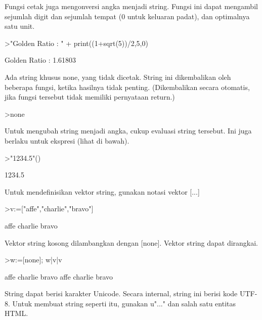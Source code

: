 \documentclass[a4paper,10pt]{article}
\begin{document}
\begin{eulernotebook}
\begin{eulercomment}
\begin{eulercomment}
\begin{eulercomment}
Fungsi cetak juga mengonversi angka menjadi string. Fungsi ini dapat
mengambil sejumlah digit dan sejumlah tempat (0 untuk keluaran padat),
dan optimalnya satu unit.
\end{eulercomment}
\begin{eulerprompt}
>"Golden Ratio : " + print((1+sqrt(5))/2,5,0)
\end{eulerprompt}
\begin{euleroutput}
  Golden Ratio : 1.61803
\end{euleroutput}
\begin{eulercomment}
Ada string khusus none, yang tidak dicetak. String ini dikembalikan
oleh beberapa fungsi, ketika hasilnya tidak penting. (Dikembalikan
secara otomatis, jika fungsi tersebut tidak memiliki pernyataan
return.)
\end{eulercomment}
\begin{eulerprompt}
>none
\end{eulerprompt}
\begin{eulercomment}
Untuk mengubah string menjadi angka, cukup evaluasi string tersebut.
Ini juga berlaku untuk ekspresi (lihat di bawah).
\end{eulercomment}
\begin{eulerprompt}
>"1234.5"()
\end{eulerprompt}
\begin{euleroutput}
  1234.5
\end{euleroutput}
\begin{eulercomment}
Untuk mendefinisikan vektor string, gunakan notasi vektor [...]
\end{eulercomment}
\begin{eulerprompt}
>v:=["affe","charlie","bravo"]
\end{eulerprompt}
\begin{euleroutput}
  affe
  charlie
  bravo
\end{euleroutput}
\begin{eulercomment}
Vektor string kosong dilambangkan dengan [none]. Vektor string dapat
dirangkai.
\end{eulercomment}
\begin{eulerprompt}
>w:=[none]; w|v|v
\end{eulerprompt}
\begin{euleroutput}
  affe
  charlie
  bravo
  affe
  charlie
  bravo
\end{euleroutput}
\begin{eulercomment}
String dapat berisi karakter Unicode. Secara internal, string ini
berisi kode UTF-8. Untuk membuat string seperti itu, gunakan u"..."
dan salah satu entitas HTML.


\end{eulercomment}
\end{eulercomment}
\end{eulercomment}
\end{eulernotebook}
\end{document}
